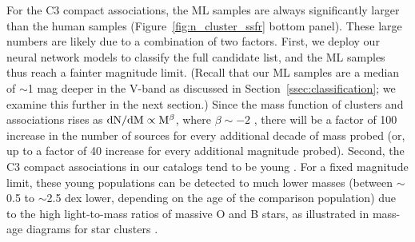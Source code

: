 \documentclass[linenumbers]{aastex63}
\begin{document}
For the C3 compact associations, the ML samples are always significantly larger than the human samples (Figure~\ref{fig:n_cluster_ssfr} bottom panel). 
These large numbers are likely due to a combination of two factors.
First, we deploy our neural network models to classify the full candidate list, and the ML samples thus reach a fainter magnitude limit.  (Recall that our ML samples are a median of $\sim$1 mag deeper in the V-band as discussed in Section~\ref{ssec:classification}; we examine this further in the next section.)  Since the mass function of clusters and associations rises as $\rm{dN/dM} \propto M{^\beta}$, where $\beta\sim-2$ \citep[and references therein]{krumholz_star_2019}, there will be a factor of 100 increase in the number of sources for every additional decade of mass probed (or, up to a factor of 40 increase for every additional magnitude probed).  Second, the C3 compact associations in our catalogs tend to be young \citep[$\lesssim$10 Myr, e.g.,][see also Sec~\ref{ssect:cc_regions}]{lee_phangs-hst_2022}.  For a fixed magnitude limit, these young populations can be detected to much lower masses (between $\sim$0.5 to $\sim$2.5 dex lower, depending on the age of the comparison population) due to the high light-to-mass ratios of massive O and B stars, as illustrated in mass-age diagrams for star clusters \citep[e.g.,][Figure 13]{cook_star_2019}.  

\end{document}
